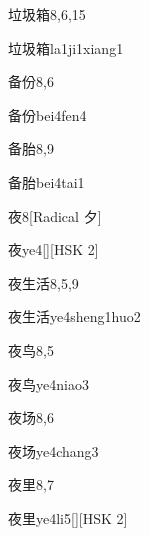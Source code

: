 \begin{entry}{垃圾箱}{8,6,15}
  \begin{phonetics}{垃圾箱}{la1ji1xiang1}
  \end{phonetics}
\end{entry}

\begin{entry}{备份}{8,6}
  \begin{phonetics}{备份}{bei4fen4}
  \end{phonetics}
\end{entry}

\begin{entry}{备胎}{8,9}
  \begin{phonetics}{备胎}{bei4tai1}
  \end{phonetics}
\end{entry}

\begin{entry}{夜}{8}[Radical 夕]
  \begin{phonetics}{夜}{ye4}[][HSK 2]
  \end{phonetics}
\end{entry}

\begin{entry}{夜生活}{8,5,9}
  \begin{phonetics}{夜生活}{ye4sheng1huo2}
  \end{phonetics}
\end{entry}

\begin{entry}{夜鸟}{8,5}
  \begin{phonetics}{夜鸟}{ye4niao3}
  \end{phonetics}
\end{entry}

\begin{entry}{夜场}{8,6}
  \begin{phonetics}{夜场}{ye4chang3}
  \end{phonetics}
\end{entry}

\begin{entry}{夜里}{8,7}
  \begin{phonetics}{夜里}{ye4li5}[][HSK 2]
  \end{phonetics}
\end{entry}

